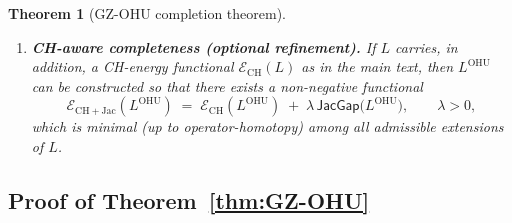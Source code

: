 \documentclass[11pt]{book}
\theoremstyle{plain}
\newtheorem{theorem}{Theorem}[chapter]      \newtheorem{proposition}[theorem]{Proposition} \newtheorem{lemma}[theorem]{Lemma}          \newtheorem{corollary}[theorem]{Corollary}
\theoremstyle{definition}
\begin{document}
\begin{theorem}[GZ-OHU completion theorem]
\begin{enumerate}
  \item[\textnormal{(4)}] \textbf{CH-aware completeness (optional refinement).}
    If \(L\) carries, in addition, a CH-energy functional
    \(\mathcal{E}_{\mathrm{CH}}(L)\) as in the main text, then
    \(L^{\mathrm{OHU}}\) can be constructed so that there exists a
    non-negative functional
    \[
      \mathcal{E}_{\mathrm{CH+Jac}}(L^{\mathrm{OHU}})
      \;=\;
      \mathcal{E}_{\mathrm{CH}}(L^{\mathrm{OHU}})
      \;+\;
      \lambda\,\mathsf{JacGap}\bigl(L^{\mathrm{OHU}}\bigr),
      \qquad \lambda>0,
    \]
    which is minimal (up to operator-homotopy) among all admissible
    extensions of \(L\).
\end{enumerate}
\end{theorem}



\subsection*{Proof of Theorem~\ref{thm:GZ-OHU}}
\end{document}
